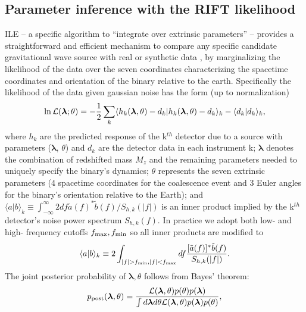\documentclass[twocolumn,prd,nofootinbib]{revtex4}
\newcommand\ILE{ILE}
\begin{document}
\subsection{Parameter inference with the RIFT likelihood}
\ILE{}  -- a specific algorithm to ``integrate over extrinsic parameters'' -- provides a straightforward and efficient mechanism to compare any specific candidate gravitational wave source with
real or synthetic data   \cite{gwastro-PE-AlternativeArchitectures,NRPaper,2017PhRvD..96j4041L,2017CQGra..34n4002O},
by marginalizing the likelihood of the data over the seven coordinates characterizing the spacetime coordinates and
orientation of the binary relative to the earth.  
Specifically the likelihood of the data given gaussian noise has the form  (up to normalization)
\begin{equation}
\label{eq:lnL}
\ln {\cal L}(\bm{\lambda} ;\theta )=-\frac{1}{2}\sum\limits_{k}\langle h_{k}(\bm{\lambda} ,\theta )-d_{k} |h_{k}(\bm{\lambda} ,\theta )-d_{k}\rangle _{k}-\langle d_{k}|d_{k}\rangle _{k},
\end{equation}
where $h_{k}$ are the predicted response of the k$^{th}$ detector due to a source with parameters ($\bm{\lambda}$, $\theta$) and
$d_{k}$ are the detector data in each instrument k; $\bm{\lambda}$ denotes the combination of redshifted mass $M_{z}$ and the
remaining parameters needed to uniquely specify the binary's dynamics; $\theta$ represents the
seven extrinsic parameters (4 spacetime coordinates for the coalescence event and 3 Euler angles for the binary's
orientation relative to the Earth); and $\langle a|b\rangle_{k}\equiv
\int_{-\infty}^{\infty}2df\tilde{a}(f)^{*}\tilde{b}(f)/S_{h,k}(|f|)$ is an inner product implied by the k$^{th}$ detector's
noise power spectrum $S_{h,k}(f)$. 
In practice we adopt both  low- and high- frequency cutoffs $f_{\rm max},f_{\rm min}$ so all inner products are modified to
\begin{equation}
\label{eq:overlap}
\langle a|b\rangle_{k}\equiv 2 \int_{|f|>f_{\rm min},|f|<f_{\rm max}}df\frac{[\tilde{a}(f)]^{*}\tilde{b}(f)}{S_{h,k}(|f|)}.
\end{equation}
The joint posterior probability of $\bm{\lambda} ,\theta$ follows from Bayes' theorem:
\begin{equation}
p_{\rm post}(\bm{\lambda} ,\theta)=\frac{ {\cal L}(\bm{\lambda} ,\theta)p(\theta)p(\bm{\lambda})}{\int d\bm{\lambda} d\theta {\cal L}(\bm{\lambda} ,\theta)p(\bm{\lambda})p(\theta)},
\end{equation}
\end{document}
